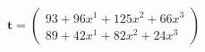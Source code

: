\documentclass[preview]{standalone}
\begin{document}
\begin{align*}
\mathbf{t} = \begin{pmatrix}93 + 96x^{1} + 125x^{2} + 66x^{3} \\ 89 + 42x^{1} + 82x^{2} + 24x^{3}\end{pmatrix}
\end{align*}
\end{document}
